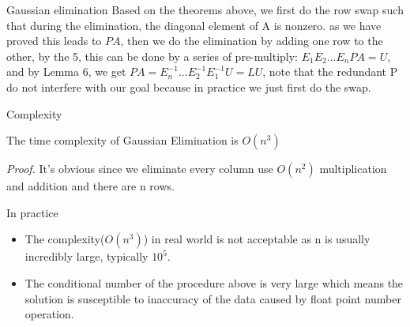 \documentclass[9pt]{beamer}
\newcommand{\ccb}[1]{{\color{blue}#1}}
\newcommand{\ccm}[1]{{\color{magenta}#1}}
\begin{document}
	\begin{frame}{Gaussian elimination}
		Based on the theorems above, we first do the row swap such that during the elimination, the diagonal element of A is nonzero. as we have proved this leads to \ccb{$PA$}, then we do the elimination by adding one row to the other, by the  5, this can be done by a series of pre-multiply: \ccb{$E_{1}E_{2}...E_{n}PA=U$}, and by Lemma 6, we get \ccb{$PA=E_{n}^{-1}...E_{2}^{-1}E_{1}^{-1}U=LU$}, note that the redundant P do not interfere with our goal because in practice we just first do the swap.
	\end{frame}

	\begin{frame}{Complexity}
		\begin{theorem}
			The time complexity of Gaussian Elimination is \ccb{$O(n^3)$}
		\end{theorem}\pause\bigskip
		\ccm{\em Proof.} It's obvious since we eliminate every column use \ccb{$O(n^2)$} multiplication and addition and there are n rows.
	\end{frame}

	\begin{frame}{In practice}
		\begin{itemize}
			\item The complexity(\ccb{$O(n^3)$}) in real world is not acceptable as n is usually incredibly large, typically $10^5$.\pause\bigskip
			\item The conditional number of the procedure above is very large which means the solution is susceptible to inaccuracy of the data caused by float point number operation.
		\end{itemize}
	\end{frame}
\end{document}
